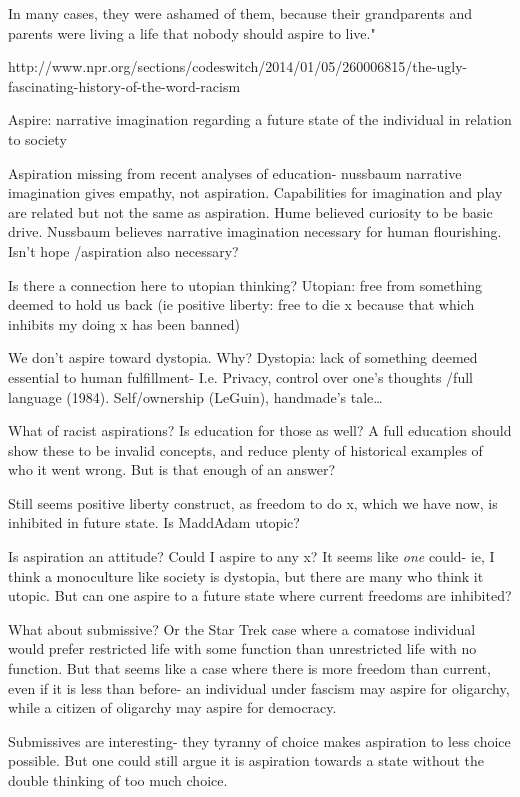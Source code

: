 In many cases, they were ashamed of them, because their grandparents and parents were living a life that nobody should aspire to live."

http:\slash \slash www.npr.org\slash sections\slash codeswitch\slash 2014\slash 01\slash 05\slash 260006815\slash the-ugly-fascinating-history-of-the-word-racism

Aspire: narrative imagination regarding a future state of the individual in relation to society

Aspiration missing from recent analyses of education- nussbaum narrative imagination gives empathy, not aspiration. Capabilities for imagination and play are related but not the same as aspiration. Hume believed curiosity to be basic drive. Nussbaum believes narrative imagination necessary for human flourishing. Isn't hope \slash aspiration also necessary?

Is there a connection here to utopian thinking?
Utopian: free from something deemed to hold us back (ie positive liberty: free to die x because that which inhibits my doing x has been banned)

We don't aspire toward dystopia. Why?
Dystopia: lack of something deemed essential to human fulfillment- I.e. Privacy, control over one's thoughts \slash  full language (1984). Self\slash ownership (LeGuin), handmade's tale{\ldots}

What of racist aspirations? Is education for those as well? A full education should show these to be invalid concepts, and reduce plenty of historical examples of who it went wrong. But is that enough of an answer?

Still seems positive liberty construct, as freedom to do x, which we have now, is inhibited in future state. Is MaddAdam utopic?

Is aspiration an attitude? Could I aspire to any x? It seems like \emph{one} could- ie, I think a monoculture like society is dystopia, but there are many who think it utopic. But can one aspire to a future state where current freedoms are inhibited? 

What about submissive? Or the Star Trek case where a comatose individual would prefer restricted life with some function than unrestricted life with no function. But that seems like a case where there is more freedom than current, even if it is less than before- an individual under fascism may aspire for oligarchy, while a citizen of oligarchy may aspire for democracy.

Submissives are interesting- they tyranny of choice makes aspiration to less choice possible. But one could still argue it is aspiration towards a state without the double thinking of too much choice.

